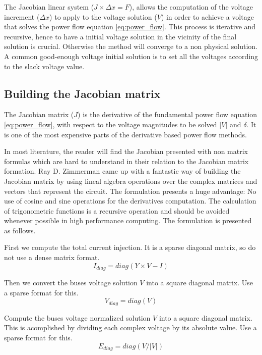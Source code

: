 \documentclass[a4paper,twoside]{tufte-book}
\begin{document}
The Jacobian linear system ($J \times \Delta x = F$), allows the computation of the voltage increment ($\Delta x$) to apply to the voltage solution ($V$) in order to achieve a voltage that solves the power flow equation \ref{eq:power_flow}. This process is iterative and recursive, hence to have a initial voltage solution in the vicinity of the final solution is crucial. Otherwise the method will converge to a non physical solution. A common good-enough voltage initial solution is to set all the voltages according to the slack voltage value.


\subsection{Building the Jacobian matrix} \label{Jacobian_chapter}

The Jacobian matrix ($J$) is the derivative of the fundamental power flow equation \ref{eq:power_flow}, with respect to the voltage magnitudes to be solved $|V|$ and $\delta$. It is one of the most expensive parts of the derivative based power flow methods.

In most literature, the reader will find the Jacobian presented with non matrix formulas which are hard to understand in their relation to the Jacobian matrix formation. Ray D. Zimmerman came up with a fantastic way of building the Jacobian matrix \cite{zimmerman2010ac} by using lineal algebra operations over the complex matrices and vectors that represent the circuit. The formulation presents a huge advantage: No use of cosine and sine operations for the derivatives computation. The calculation of trigonometric functions is a recursive operation and should be avoided whenever possible in high performance computing. The formulation is presented as follows.

First we compute the total current injection. It is a sparse diagonal matrix, so do not use a dense matrix format.
\begin{equation}
I_{diag} = diag(Y \times V - I)
\end{equation}

Then we convert the buses voltage solution $V$ into a square diagonal matrix. Use a sparse format for this.
\begin{equation}
V_{diag} = diag(V)
\end{equation}

Compute the buses voltage normalized solution $V$ into a square diagonal matrix. This is acomplished by dividing each complex voltage by its absolute value. Use a sparse format for this.
\begin{equation}
E_{diag} = diag(V / |V|)
\end{equation}
\end{document}
